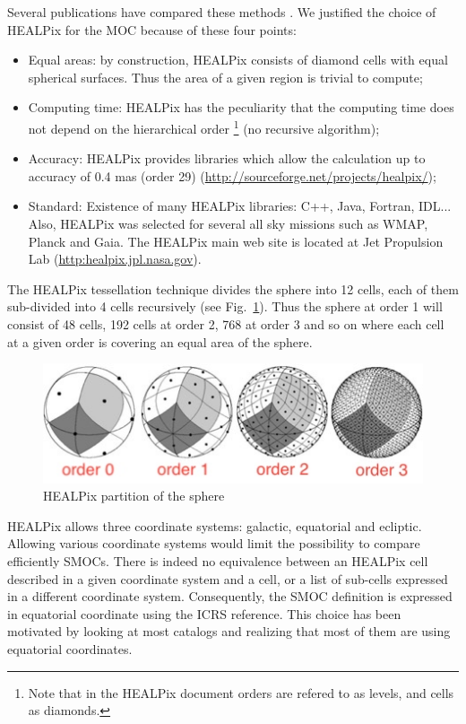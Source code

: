 \documentclass[11pt,a4paper]{ivoa}
\begin{document}
Several publications have compared these methods \citep{2001misk.conf..638O}. We
justified the choice of HEALPix for the MOC because of these four
points:

\begin{itemize}
\item Equal areas: by construction, HEALPix consists of diamond cells with
  equal spherical surfaces. Thus the area of a given region is trivial
  to compute;
\item Computing time: HEALPix has the peculiarity that the computing
  time does not depend on the hierarchical order \footnote{Note that in the HEALPix
  document orders are refered to as levels, and cells as diamonds.}
  (no recursive  algorithm);
\item Accuracy: HEALPix provides libraries which allow the calculation
  up to accuracy of 0.4 mas (order 29) (\url{http://sourceforge.net/projects/healpix/});
\item Standard: Existence of many HEALPix libraries: C++, Java,
  Fortran, IDL... Also, HEALPix was selected for several all sky
  missions such as WMAP, Planck and Gaia. The HEALPix main web site is
  located at Jet Propulsion Lab (\url{http:healpix.jpl.nasa.gov}).
\end{itemize}

The HEALPix \citep{2005ApJ...622..759G} tessellation technique divides
the sphere into 12 cells, each of them sub-divided into 4 cells
recursively (see Fig.~\ref{fig:healpix}). Thus the sphere at order 1
will consist of 48 cells,
192 cells at order 2, 768 at order 3 and so on where each cell
at a given order is covering an equal area of the sphere.

\begin{figure}[!htbp]
\begin{center}
\includegraphics[scale=0.8]{healpix.jpg}
\end{center}
\caption{HEALPix partition of the sphere}
\label{fig:healpix}
\end{figure}

HEALPix allows three coordinate systems: galactic, equatorial and
ecliptic. Allowing various coordinate systems would limit the
possibility to compare efficiently SMOCs. There is indeed no
equivalence between an HEALPix cell described in a given coordinate
system and a cell, or a list of sub-cells expressed in a different
coordinate system. Consequently, the SMOC definition is expressed in
equatorial coordinate using the ICRS reference. This choice has been
motivated by looking at most catalogs and realizing that most of them
are using equatorial coordinates.
\end{document}
